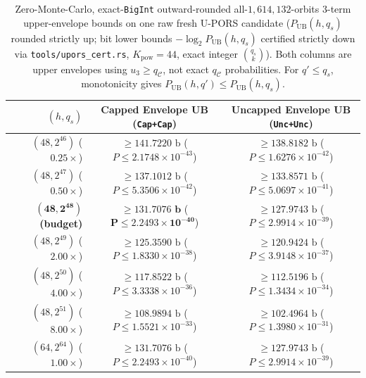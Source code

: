 \documentclass[11pt,a4paper]{article}
\theoremstyle{definition}
\theoremstyle{remark}
\newcommand{\UPORS}{\textsf{U-PORS}}
\newcommand{\calC}{\mathcal{C}}
\begin{document}
\begin{table}[t]
\centering
\footnotesize
\setlength{\tabcolsep}{3.5pt}
\caption{Zero-Monte-Carlo, exact-\texttt{BigInt} outward-rounded all-$1{,}614{,}132$-orbits $3$-term upper-envelope bounds on one raw fresh \UPORS{} candidate ($P_{\mathrm{UB}}(h, q_s)$ rounded strictly up; bit lower bounds $-\log_2 P_{\mathrm{UB}}(h, q_s)$ certified strictly down via \texttt{tools/upors\_cert.rs}, $K_{\mathrm{pow}} = 44$, exact integer $\binom{q_s}{k}$). Both columns are upper envelopes using $u_3 \ge q_\calC$, not exact $q_\calC$ probabilities. For $q' \le q_s$, monotonicity gives $P_{\mathrm{UB}}(h, q') \le P_{\mathrm{UB}}(h, q_s)$.}
\label{tab:itsr}
\begin{tabular}{@{}rcc@{}}
\toprule
$(h, q_s)$ & Capped Envelope UB (\texttt{Cap+Cap}) & Uncapped Envelope UB (\texttt{Unc+Unc}) \\
\midrule
$(48, 2^{46})$ ($0.25\times$) & $\ge 141.7220\text{ b}$ ($P \le 2.1748 \times 10^{-43}$) & $\ge 138.8182\text{ b}$ ($P \le 1.6276 \times 10^{-42}$) \\
$(48, 2^{47})$ ($0.50\times$) & $\ge 137.1012\text{ b}$ ($P \le 5.3506 \times 10^{-42}$) & $\ge 133.8571\text{ b}$ ($P \le 5.0697 \times 10^{-41}$) \\
$\mathbf{(48, 2^{48})}$ \textbf{(budget)} & $\mathbf{\ge 131.7076\text{ b}}$ ($\mathbf{P \le 2.2493 \times 10^{-40}}$) & $\ge 127.9743\text{ b}$ ($P \le 2.9914 \times 10^{-39}$) \\
$(48, 2^{49})$ ($2.00\times$) & $\ge 125.3590\text{ b}$ ($P \le 1.8330 \times 10^{-38}$) & $\ge 120.9424\text{ b}$ ($P \le 3.9148 \times 10^{-37}$) \\
$(48, 2^{50})$ ($4.00\times$) & $\ge 117.8522\text{ b}$ ($P \le 3.3338 \times 10^{-36}$) & $\ge 112.5196\text{ b}$ ($P \le 1.3434 \times 10^{-34}$) \\
$(48, 2^{51})$ ($8.00\times$) & $\ge 108.9894\text{ b}$ ($P \le 1.5521 \times 10^{-33}$) & $\ge 102.4964\text{ b}$ ($P \le 1.3980 \times 10^{-31}$) \\
\midrule
$(64, 2^{64})$ ($1.00\times$) & $\ge 131.7076\text{ b}$ ($P \le 2.2493 \times 10^{-40}$) & $\ge 127.9743\text{ b}$ ($P \le 2.9914 \times 10^{-39}$) \\
\bottomrule
\end{tabular}
\end{table}
\end{document}
